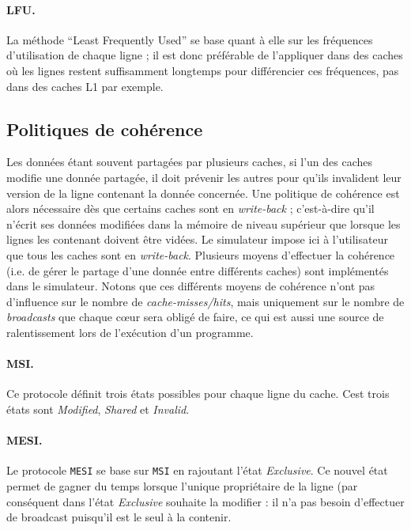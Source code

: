 \paragraph{LFU.}La méthode ``Least Frequently Used'' se base quant à elle sur les fréquences d'utilisation de chaque ligne ; il est donc préférable de l'appliquer dans des caches où les lignes restent suffisamment longtemps pour différencier ces fréquences, pas dans des caches L1 par exemple. 

\subsection{Politiques de cohérence}
\label{coher}

Les données étant souvent partagées par plusieurs caches, si l'un des caches modifie une donnée partagée, il doit prévenir les autres pour qu'ils invalident leur version de la ligne contenant la donnée concernée. Une politique de cohérence est alors nécessaire dès que certains caches sont en \emph{write-back} ; c'est-à-dire qu'il n'écrit ses données modifiées dans la mémoire de niveau supérieur que lorsque les lignes les contenant doivent être vidées. Le simulateur impose ici à l'utilisateur que tous les caches sont en \emph{write-back}. Plusieurs moyens d'effectuer la cohérence (i.e. de gérer le partage d'une donnée entre différents caches) sont implémentés dans le simulateur. Notons que ces différents moyens de cohérence n'ont pas d'influence sur le nombre de \emph{cache-misses/hits}, mais uniquement sur le nombre de \emph{broadcasts} que chaque c\oe ur sera obligé de faire, ce qui est aussi une source de ralentissement lors de l'exécution d'un programme. 

\paragraph{MSI.} Ce protocole définit trois états possibles pour chaque ligne du cache. Cest trois états sont \emph{Modified}, \emph{Shared} et \emph{Invalid}.

\paragraph{MESI.} Le protocole \texttt{MESI} se base sur \texttt{MSI} en rajoutant l'état \emph{Exclusive}. Ce nouvel état permet de gagner du temps lorsque l'unique propriétaire de la ligne (par conséquent dans l'état \emph{Exclusive} souhaite la modifier : il n'a pas besoin d'effectuer de broadcast puisqu'il est le seul à la contenir.

